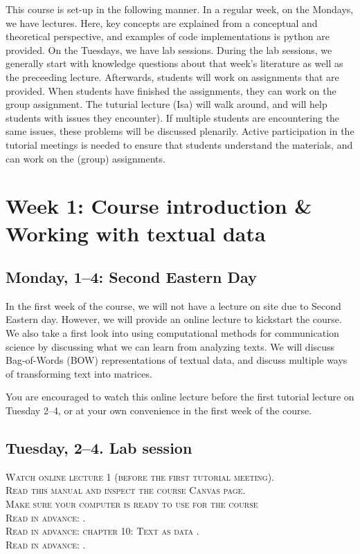 This course is set-up in the following manner. In a regular week, on the Mondays, we have lectures. Here, key concepts are explained from a conceptual and theoretical perspective, and examples of code implementations is python are provided.  On the Tuesdays, we have lab sessions. During the lab sessions, we generally start with knowledge questions about that week's literature as well as the preceeding lecture. Afterwards, students will work on assignments that are provided. When students have finished the assignments, they can work on the group assignment. The tuturial lecture (Isa) will walk around, and will help students with issues they encounter). If multiple students are encountering the same issues, these problems will be discussed plenarily. Active participation in the tutorial meetings is needed to ensure that students understand the materials, and can work on the (group) assignments.

\section*{Week 1: Course introduction \& Working with textual data}

\subsection*{Monday, 1--4:  Second Eastern Day}

In the first week of the course, we will not have a lecture on site due to Second Eastern day. However, we will provide an online lecture to kickstart the course. We also take a first look into using computational methods for communication science by discussing what we can learn from analyzing texts. We will discuss Bag-of-Words (BOW) representations of textual data, and discuss multiple ways of transforming text into matrices. 

You are encouraged to watch this online lecture  before the first tutorial lecture on Tuesday 2--4, or at your own convenience in the first week of the course. 


\subsection*{Tuesday, 2--4. Lab session}

\textsc{ Watch online lecture 1 (before the first tutorial meeting).}\\
\textsc{ Read this manual and inspect the course Canvas page.}\\
\textsc{ Make sure your computer is ready to use for the course }\\
\textsc{ Read in advance: \cite{Hirschenberg2015}.} \\
\textsc{Read in advance: chapter 10: Text as data \cite{van_atteveldt_computational_2022}.} \\
\textsc{Read in advance: \cite{Boumans2016}.} \\

